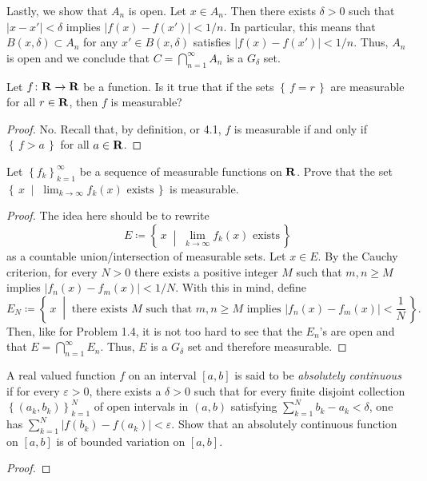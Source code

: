 Lastly, we show that $A_n$ is open. Let $x\in A_n$. Then there exists
$\delta>0$ such that $|x-x'|<\delta$ implies $|f(x)-f(x')|<1/n$. In
particular, this means that $B(x,\delta)\subset A_n$ for any $x'\in
B(x,\delta)$ satisfies $|f(x)-f(x')|<1/n$. Thus, $A_n$ is open and we
conclude that $C=\bigcap_{n=1}^\infty A_n$ is a $G_\delta$ set.
\begin{problem}
Let $f\colon\mathbf{R}\to\mathbf{R}$ be a function. Is it true that if the sets
$\left\{\,f=r\,\right\}$ are measurable for all $r\in\mathbf{R}$, then $f$ is
measurable?
\end{problem}
\begin{proof}
No. Recall that, by definition, or 4.1, $f$ is measurable if and only if
$\left\{\,f>a\,\right\}$ for all $a\in\mathbf{R}$.
\end{proof}

\begin{problem}
Let $\left\{f_k\right\}_{k=1}^\infty$ be a sequence of measurable functions
on $\mathbf{R}$. Prove that the set
$\left\{\,x\;\middle|\;\text{$\lim_{k\to\infty} f_k(x)$ exists}\,\right\}$
is measurable.
\end{problem}
\begin{proof}
The idea here should be to rewrite
\begin{equation}
  \label{eq:measurable-lim-set}
E\coloneqq\left\{\,x\;\middle|\;\text{$\lim_{k\to\infty} f_k(x)$ exists}\,\right\}
\end{equation}
as a countable union/intersection of measurable sets. Let $x\in E$. By the
Cauchy criterion, for every $N>0$ there exists a positive integer
$M$ such that $m,n\geq M$ implies
$\left|f_n(x)-f_m(x)\right|<1/N$. With this in mind, define
\begin{equation}
  \label{eq:countable-lim-set}
E_N\coloneqq
\left\{\,
x
\;\middle|\;
\text{
there exists $M$ such that $m,n\geq M$ implies $\left|f_n(x)-f_m(x)\right|<\frac{1}{N}$
}
\,\right\}.
\end{equation}
Then, like for Problem 1.4, it is not too hard to see that the $E_n$'s are
open and that $E=\bigcap_{n=1}^\infty E_n$. Thus, $E$ is a $G_\delta$ set
and therefore measurable.
\end{proof}

\begin{problem}
A real valued function $f$ on an interval $[a,b]$ is said to be
\emph{absolutely continuous} if for every $\varepsilon>0$, there exists a
$\delta>0$ such that for every finite disjoint collection
$\left\{(a_k,b_k)\right\}_{k=1}^N$ of open intervals in $(a,b)$ satisfying
$\sum_{k=1}^Nb_k-a_k<\delta$, one has
$\sum_{k=1}^N\left|f(b_k)-f(a_k)\right|<\varepsilon$. Show that an
absolutely continuous function on $[a,b]$ is of bounded variation on
$[a,b]$.
\end{problem}
\begin{proof}

\end{proof}

